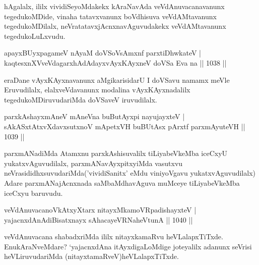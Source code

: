 \begin{artha}
hAgalalx, ililx vividiSeyoMdakekx kAraNavAda veVdAnuvacanavanunx tegedukoMDide, vinaha 
tatavxvanunx boVdhisuva veVdAMtavanunx tegedukoMDilalx, neVratatavxjAcnxnavAguvudakekx 
veVdAMtavanunx tegedukoLuLxvudu.
\end{artha}

\begin{shl}
apayxBUyxpagameV nAyaM doVSoV\s sAmxnf parxtiDhwkateV |\\
kaqtesxnXVveVdagarxhAdAdayxvAyxKAyxneV doVSa Eva na || 1038 ||
\end{shl}

\begin{artha}
eraDane vAyxKAyxnavanunx aMgikarisidarU I doVSavu namamx meVle Eruvudilalx, 
elalxveVdavanunx modalina vAyxKAyxnadalilx tegedukoMDiruvudariMda doVSaveV iruvudilalx.
\end{artha}


\begin{shl}
parxkAshayxmAneV mAneVna buButAyx\s pi nayujayxteV |\\
sAkASxtAtxvXdavxsutxnoV mApetxVH buBUtAsx pArxtf parxmAyuteVH || 1039 ||
\end{shl}

\begin{artha}
parxmANadiMda Atamxnu parxkAshisuvalilx tiLiyabeVkeMba iceCxyU yukatxvAguvudilalx, parxmANavAyxpitxyiMda vasutxvu neVrasididhxsuvudariMda('vividiSanitx' eMdu viniyoVgavu yukatxvAguvudilalx) Adare parxmANajAcnxnada saMbaMdhavAguva muMceye tiLiyabeVkeMba iceCxyu baruvudu.
\end{artha}


\begin{shl}
veVdAnuvacanoVkAtxyX\s tarx \footnotemark[1]nitayxMkamoVRpadishayxteV |\\
yajacnxdAnAdiBisatxnayx sAhacayeVRNaheVtunA || 1040 ||
\end{shl}

\begin{artha}
veVdAnuvacana shabadxriMda ililx nitayxkamaRvu heVLalapxTiTxde. EnukAraNveMdare? `yajacnxdAna itAyxdigaLoMdige joteyalilx adanunx seVrisi heVLiruvudariMda (nitayxtamaRveV)heVLalapxTiTxde.
\end{artha}

